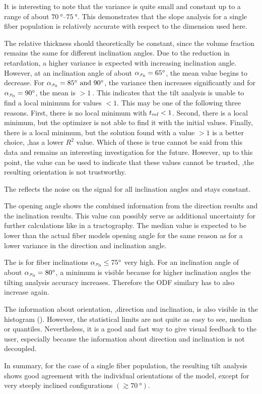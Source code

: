 It is interesting to note that the variance is quite small and constant up to a range of about $\SIrange{70}{75}{\degree}$.
This demonstrates that the slope analysis for a single fiber population is relatively accurate with respect to the dimension used here.
\par
%
The relative thickness \trel{} should theoretically be constant, since the volume fraction remains the same for different inclination angles.
Due to the reduction in retardation, a higher variance is expected with increasing inclination angle.
However, at an inclination angle of about $\modelInc=\SI{65}{\degree}$, the mean value begins to decrease.
For $\modelInc=\SIlist{85;90}{\degree}$, the variance then increases significantly and for $\modelInc=\SI{90}{\degree}$, the mean is $>\SI{1}{}$.
This indicates that the tilt analysis is unable to find a local minimum for \trel{} values $<1$.
This may be one of the following three reasons.
First, there is no local minimum with $\textnormal{$t_\mathit{rel}$}<1$.
Second, there is a local minimum, but the optimizer is not able to find it with the initial values.
Finally, there is a local minimum, but the solution found with a \trel{} value $>1$ is a better choice, \ie{},has a lower $R^2$ value.
Which of these is true cannot be said from this data and remains an interesting investigation for the future.
However, up to this point, the \trel{} value can be used to indicate that these values cannot be trusted, \ie{},the resulting orientation is not trustworthy.
\par
% 
The \rvalue{} reflects the noise on the signal for all inclination angles and stays constant.
\par
%
The opening angle shows the combined information from the direction results and the inclination results.
This value can possibly serve as additional uncertainty for further calculations like in a tractography.
The median value is expected to be lower than the actual fiber models opening angle for the same reason as for a lower \bvariance{} variance in the direction and inclination angle.
\par
%
The \accvalue{} is for fiber inclinations $\modelInc \leq \SI{75}{\degree}$ very high.
For an inclination angle of about $\modelInc = \SI{80}{\degree}$, a minimum is visible because for higher inclination angles the tilting analysis accuracy increases.
Therefore the \ac{ODF} similary has to also increase again.
\par
% 
The information about orientation, \ie{},direction and inclination, is also visible in the histogram ().
However, the statistical limits are not quite as easy to see, \eg median or quantiles.
Nevertheless, it is a good and fast way to give visual feedback to the user, especially because the information about direction and inclination is not decoupled.
\par
% 
In summary, for the case of a single fiber population, the resulting tilt analysis shows good agreement with the individual orientations of the model, except for very steeply inclined configurations $(\gtrsim \SI{70}{\degree})$.
%
% 
% 
